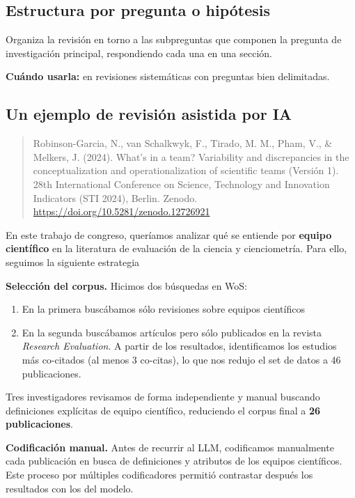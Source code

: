 \documentclass[
]{book}
\providecommand{\tightlist}{%
  \setlength{\itemsep}{0pt}\setlength{\parskip}{0pt}}
\begin{document}
\subsection{Estructura por pregunta o hipótesis}\label{estructura-por-pregunta-o-hipuxf3tesis}

Organiza la revisión en torno a las subpreguntas que componen la pregunta de investigación principal, respondiendo cada una en una sección.

\textbf{Cuándo usarla:} en revisiones sistemáticas con preguntas bien delimitadas.

\subsection{Un ejemplo de revisión asistida por IA}\label{un-ejemplo-de-revisiuxf3n-asistida-por-ia}

\begin{quote}
Robinson-Garcia, N., van Schalkwyk, F., Tirado, M. M., Pham, V., \& Melkers, J. (2024). What's in a team? Variability and discrepancies in the conceptualization and operationalization of scientific teams (Versión 1). 28th International Conference on Science, Technology and Innovation Indicators (STI 2024), Berlin. Zenodo. \url{https://doi.org/10.5281/zenodo.12726921}
\end{quote}

En este trabajo de congreso, queríamos analizar qué se entiende por \textbf{equipo científico} en la literatura de evaluación de la ciencia y cienciometría. Para ello, seguimos la siguiente estrategia

\textbf{Selección del corpus.} Hicimos dos búsquedas en WoS:

\begin{enumerate}
\def\labelenumi{\arabic{enumi}.}
\tightlist
\item
  En la primera buscábamos sólo revisiones sobre equipos científicos
\item
  En la segunda buscábamos artículos pero sólo publicados en la revista \emph{Research Evaluation}. A partir de los resultados, identificamos los estudios más co-citados (al menos 3 co-citas), lo que nos redujo el set de datos a 46 publicaciones.
\end{enumerate}

Tres investigadores revisamos de forma independiente y manual buscando definiciones explícitas de equipo científico, reduciendo el corpus final a \textbf{26 publicaciones}.

\textbf{Codificación manual.} Antes de recurrir al LLM, codificamos manualmente cada publicación en busca de definiciones y atributos de los equipos científicos. Este proceso por múltiples codificadores permitió contrastar después los resultados con los del modelo.
\end{document}
